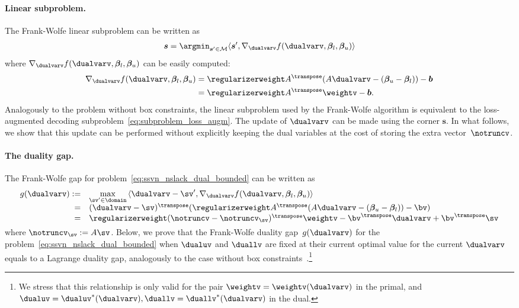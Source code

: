 \documentclass{article}
\begin{document}
\paragraph{Linear subproblem.}
The Frank-Wolfe linear subproblem can be written as
\begin{align}
\label{eq:linearizationProblemFWbox}
\bm{s} = \argmin_{\bm{s}' \in \mathcal{M}} \langle \bm{s}', \nabla_{\dualvarv} f(\dualvarv, \bm{\beta}_l, \bm{\beta}_u) \rangle
\end{align}
where $\nabla_{\dualvarv} f(\dualvarv, \bm{\beta}_l, \bm{\beta}_u)$ can be easily computed:
\begin{align}
\label{eq:gradient_ssvmdual_bounded}
\nabla_{\dualvarv} f(\dualvarv, \bm{\beta}_l, \bm{\beta}_u) &= \regularizerweight A^{\transpose} (A\dualvarv - (\bm{\beta}_u - \bm{\beta}_l)) - \bm{b} \notag \\
&= \regularizerweight A^{\transpose} \weightv - \bm{b}.
\end{align}
Analogously to the problem without box constraints, the linear subproblem used by the Frank-Wolfe algorithm is equivalent to the loss-augmented decoding subproblem~\eqref{eq:subproblem_loss_augm}.
The update of $\dualvarv$ can be made using the corner $\bm{s}$.
In what follows, we show that this update can be performed without explicitly keeping the dual variables at the cost of storing the extra vector~$\notruncv$.

\paragraph{The duality gap.} The Frank-Wolfe gap for problem~\eqref{eq:ssvn_nslack_dual_bounded} can be written as
\[
\begin{array}{rl}
\label{eq:FWdualgap_box}
  g(\dualvarv) :=& \displaystyle\max_{\sv' \in \domain} \,\langle \dualvarv - \sv',\nabla_{\dualvarv} f(\dualvarv, \bm{\beta}_l, \bm{\beta}_u) \rangle \\
    =& (\dualvarv - \sv)^\transpose (\regularizerweight A^{\transpose} (A\dualvarv - (\bm{\beta}_u - \bm{\beta}_l)) - \bv) \\
    =& \regularizerweight (\notruncv-\notruncv_{\sv})^\transpose \weightv - \bv^\transpose \dualvarv + \bv^\transpose \sv
   \vspace{-1mm}
\end{array}
\]
where $\notruncv_{\sv}:=A\sv$.
Below, we prove that the Frank-Wolfe duality gap~$g(\dualvarv)$ for the problem~\eqref{eq:ssvn_nslack_dual_bounded} when $\dualuv$ and $\duallv$ are fixed at their current optimal value for the current $\dualvarv$ equals to a Lagrange duality gap, analogously to the case without box constraints~\citep[Appendix~B.2]{lacosteJulien13bcfw}.\footnote{We stress that this relationship is only valid for the pair $\weightv = \weightv(\dualvarv)$ in the primal, and $\dualuv = \dualuv^*(\dualvarv), \duallv = \duallv^*(\dualvarv)$ in the dual.}
\end{document}
